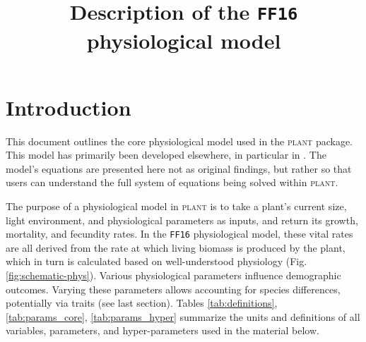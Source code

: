 \documentclass[10pt,twoside]{article}
\title{Description of the \texttt{FF16} physiological model}
\date{}
\newcommand{\plant}{\textsc{plant}}
\begin{document}
\maketitle

\tableofcontents

\section{Introduction}

This document outlines the core physiological model used in the {\plant}
package. This model has primarily been developed elsewhere, in particular in
\citet{Falster-2011}. The model's equations are presented here not as original findings,
but rather so that users can understand the full system of equations being
solved within {\plant}.

The purpose of a physiological model in {\plant} is to take a plant's
current size, light environment, and physiological parameters as inputs,
and return its growth, mortality, and fecundity rates. In the \texttt{FF16}
physiological model, these vital rates are all
derived from the rate at which living biomass is produced by the plant,
which in turn is calculated based on well-understood physiology (Fig.
\ref{fig:schematic-phys}). Various physiological parameters
influence demographic outcomes. Varying these parameters allows accounting for
species differences, potentially via traits (see last
section). Tables
\ref{tab:definitions}, \ref{tab:params_core}, \ref{tab:params_hyper} summarize the
units and definitions of all variables, parameters, and hyper-parameters used in
the material below.
\end{document}
